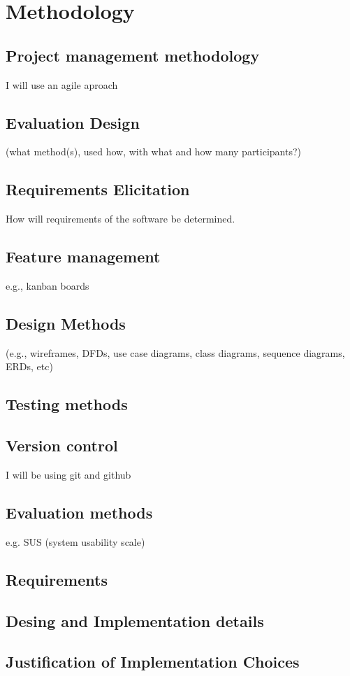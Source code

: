 \chapter{Methodology}
\label{methodology}

\section{Project management methodology}
  I will use an agile aproach

\section{Evaluation Design}
 (what method(s), used how, with what and how many participants?)

\section{Requirements Elicitation}
  How will requirements of the software be determined.

\section{Feature management}
  e.g., kanban boards

\section{Design Methods}
   (e.g., wireframes, DFDs, use case diagrams, class diagrams, sequence diagrams, ERDs, etc)

\section{Testing methods}

\section{Version control}
  I will be using git and github

\section{Evaluation methods}
  e.g. SUS (system usability scale)

\section{Requirements}

\section{Desing and Implementation details}

\section{Justification of Implementation Choices}
